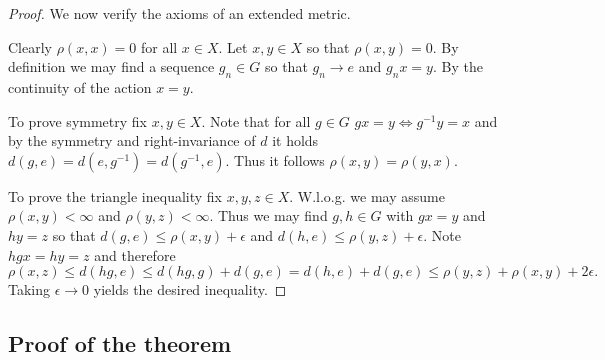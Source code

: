 \documentclass[11pt]{article}
\theoremstyle{plain}
\theoremstyle{definition}
\numberwithin{figure}{section}
\begin{document}
\begin{proof}
We now verify the axioms of an extended metric.

Clearly $\rho(x,x)=0$ for all $x\in X$. Let $x,y\in X$ so that $\rho(x,y)=0$. By definition we may find a sequence $g_n\in G$ so that $g_n\rightarrow e$ and $g_n x=y$. By the continuity of the action $x=y$.

To prove symmetry fix $x,y\in X$. Note that for all $g\in G$ $gx=y \Leftrightarrow g^{-1}y=x$ and by the symmetry and right-invariance of $d$ it holds $d(g,e)=d(e,g^{-1})=d(g^{-1},e)$. Thus it follows $\rho(x,y)=\rho(y,x)$.

To prove the triangle inequality
fix $x,y,z\in X$. W.l.o.g. we may assume $\rho(x,y)<\infty$ and $\rho(y,z)<\infty$. Thus we may find $g,h\in G$ with
$gx=y$ and $hy=z$ so that $
d(g,e)\le \rho(x,y)+\epsilon$ and $d(h,e)\le \rho(y,z)+\epsilon$. Note $hgx=hy=z$ and therefore
$$
\rho(x,z)\le d(hg,e) \le d(hg,g)+d(g,e) = d(h,e)+d(g,e) \le \rho(y,z)+\rho(x,y)+2\epsilon.
$$
Taking $\epsilon\rightarrow 0$ yields the desired inequality.

\end{proof}

\subsection{Proof of the theorem}
\end{document}
